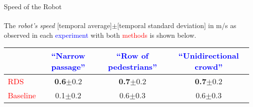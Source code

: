 \documentclass{article}
\begin{document}
{\centering\Large Speed of the Robot\\}~\\
The {\it robot's speed} [temporal average]$\pm$[temporal standard deviation] in m/s as observed in each \textcolor{blue}{experiment} with both \textcolor{red}{methods} is shown below.
\begin{table}[h]
	\centering
	\begin{tabular}{|l|c|c|c|}
		\hline
		  & \textcolor{blue}{``Narrow passage''}              & \textcolor{blue}{``Row of pedestrians''} & \textcolor{blue}{``Unidirectional crowd''}\\
		\hline
		\textcolor{red}{RDS}      & \textbf{0.6}$\pm$0.2 & \textbf{0.7}$\pm$0.2 & \textbf{0.7}$\pm$0.2\\
		\hline
		\textcolor{red}{Baseline} & 0.1$\pm$0.2          & 0.6$\pm$0.3          & 0.6$\pm$0.3         \\
		\hline
	\end{tabular}
\end{table}
\end{document}
